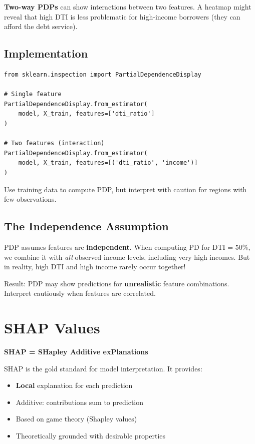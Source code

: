 \documentclass[11pt,a4paper]{article}
\newcommand{\keyword}[1]{\textbf{\textcolor{AccentOrange}{#1}}}
\begin{document}
\textbf{Two-way PDPs} can show interactions between two features. A heatmap might reveal that high DTI is less problematic for high-income borrowers (they can afford the debt service).

\subsection{Implementation}

\begin{verbatim}
from sklearn.inspection import PartialDependenceDisplay

# Single feature
PartialDependenceDisplay.from_estimator(
    model, X_train, features=['dti_ratio']
)

# Two features (interaction)
PartialDependenceDisplay.from_estimator(
    model, X_train, features=[('dti_ratio', 'income')]
)
\end{verbatim}

Use training data to compute PDP, but interpret with caution for regions with few observations.

\subsection{The Independence Assumption}

PDP assumes features are \keyword{independent}. When computing PD for DTI = 50\%, we combine it with \emph{all} observed income levels, including very high incomes. But in reality, high DTI and high income rarely occur together!

Result: PDP may show predictions for \keyword{unrealistic} feature combinations. Interpret cautiously when features are correlated.

\section{SHAP Values}

\textbf{SHAP = SHapley Additive exPlanations}

SHAP is the gold standard for model interpretation. It provides:
\begin{itemize}
    \item \keyword{Local} explanation for each prediction
    \item Additive: contributions sum to prediction
    \item Based on game theory (Shapley values)
    \item Theoretically grounded with desirable properties
\end{itemize}
\end{document}
